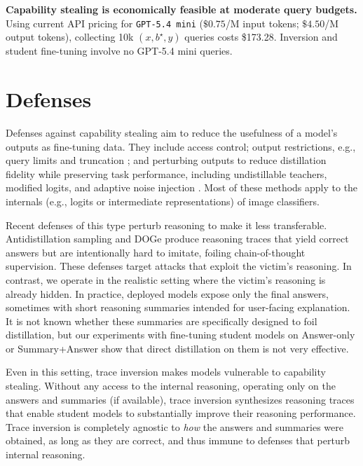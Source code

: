 \documentclass{article}
\begin{document}
\textbf{Capability stealing is economically feasible at moderate query budgets.}
Using current API pricing for \texttt{GPT-5.4 mini} ($\$0.75$/M input tokens; $\$4.50$/M output tokens), collecting 10k $(x,b^\star,y)$ queries costs \$173.28.  Inversion and student fine-tuning involve no GPT-5.4 mini queries.


\section{Defenses}
\label{sec:defenses}
Defenses against capability stealing aim to reduce the usefulness of a model’s outputs as fine-tuning data.  They include access control; output restrictions, e.g., query limits and truncation \citep{tramer2016stealing}; and perturbing outputs to reduce distillation fidelity while preserving task performance, including undistillable teachers, modified logits, and adaptive noise injection \citep{ma2021undistillable,ma2022stingy,chen2025queen}. 
Most of these methods apply to the internals (e.g., logits or intermediate representations) of image classifiers.  

Recent defenses of this type perturb reasoning to make it less transferable.  Antidistillation sampling \citep{savani2025antidistillation} and DOGe \citep{li2025doge} produce reasoning traces that yield correct answers but are intentionally hard to imitate, foiling chain-of-thought supervision.  These defenses target attacks that exploit the victim's reasoning.  In contrast, we operate in the realistic setting where the victim's reasoning is already hidden.  In practice, deployed models \citep{openai_reasoning_docs,gemini_thoughts_docs,anthropic_extended_thinking} expose only the final answers, sometimes with short reasoning summaries intended for user-facing explanation.  It is not known whether these summaries are specifically designed to foil distillation, but our experiments with fine-tuning student models on Answer-only or Summary+Answer show that direct distillation on them is not very effective. 

Even in this setting, trace inversion makes models vulnerable to capability stealing.  Without any access to the internal reasoning, operating only on the answers and summaries (if available), trace inversion synthesizes reasoning traces that enable student models to substantially improve their reasoning performance.  Trace inversion is completely agnostic to \emph{how} the answers and summaries were obtained, as long as they are correct, and thus immune to defenses that perturb internal reasoning. 
\end{document}

